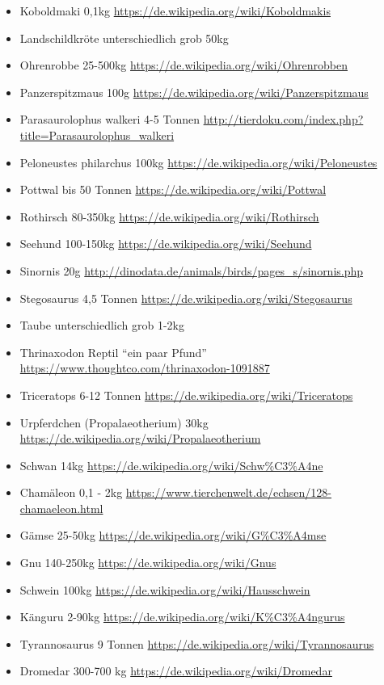 \begin{itemize}
  \item Koboldmaki 0,1kg \url{https://de.wikipedia.org/wiki/Koboldmakis}
  \item Landschildkröte unterschiedlich grob 50kg
  \item Ohrenrobbe 25-500kg \url{https://de.wikipedia.org/wiki/Ohrenrobben}
  \item Panzerspitzmaus 100g \url{https://de.wikipedia.org/wiki/Panzerspitzmaus}
  \item Parasaurolophus walkeri 4-5 Tonnen \url{http://tierdoku.com/index.php?title=Parasaurolophus_walkeri}
  \item Peloneustes philarchus 100kg \url{https://de.wikipedia.org/wiki/Peloneustes}
  \item Pottwal bis 50 Tonnen \url{https://de.wikipedia.org/wiki/Pottwal}
  \item Rothirsch 80-350kg \url{https://de.wikipedia.org/wiki/Rothirsch}
  \item Seehund 100-150kg \url{https://de.wikipedia.org/wiki/Seehund}
  \item Sinornis 20g \url{http://dinodata.de/animals/birds/pages_s/sinornis.php}
  \item Stegosaurus 4,5 Tonnen \url{https://de.wikipedia.org/wiki/Stegosaurus}
  \item Taube unterschiedlich grob 1-2kg
  \item Thrinaxodon Reptil "`ein paar Pfund"' \url{https://www.thoughtco.com/thrinaxodon-1091887}
  \item Triceratops 6-12 Tonnen \url{https://de.wikipedia.org/wiki/Triceratops}
  \item Urpferdchen (Propalaeotherium) 30kg \url{https://de.wikipedia.org/wiki/Propalaeotherium}
  \item Schwan 14kg \url{https://de.wikipedia.org/wiki/Schw\%C3\%A4ne}
  \item Chamäleon 0,1 - 2kg \url{https://www.tierchenwelt.de/echsen/128-chamaeleon.html}
  \item Gämse 25-50kg \url{https://de.wikipedia.org/wiki/G\%C3\%A4mse}
  \item Gnu 140-250kg \url{https://de.wikipedia.org/wiki/Gnus}
  \item Schwein 100kg \url{https://de.wikipedia.org/wiki/Hausschwein}
  \item Känguru 2-90kg \url{https://de.wikipedia.org/wiki/K\%C3\%A4ngurus}
  \item Tyrannosaurus 9 Tonnen \url{https://de.wikipedia.org/wiki/Tyrannosaurus}
  \item Dromedar 300-700 kg \url{https://de.wikipedia.org/wiki/Dromedar}

\end{itemize}
